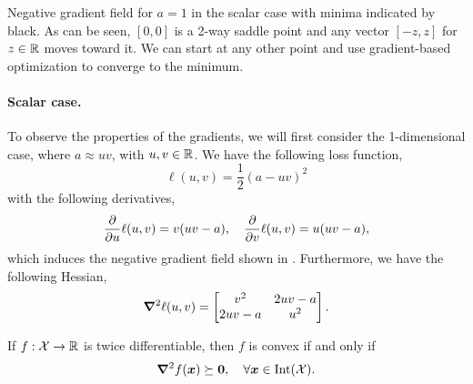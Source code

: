 \begin{marginfigure}
    \centering
    \caption{Negative gradient field for $a=1$ in the scalar case with minima indicated by black. As can be seen, $[0,0]$ is a 2-way saddle point and any vector $[-z,z]$ for $z\in\mathbb{R}$ moves toward it. We can start at any other point and use gradient-based optimization to converge to the minimum.}
    \label{fig:grad-field}
\end{marginfigure}

\paragraph{Scalar case.}

To observe the properties of the gradients, we will first consider the 1-dimensional case, where $a
    \approx uv$, with $u,v\in\mathbb{R}$. We have the following loss function, \[
    \ell(u,v) = \frac{1}{2} (a - uv)^2
\]
with the following derivatives, \[
    \pdv*{\ell(u,v)}{u} = v(uv - a), \quad \pdv*{\ell(u,v)}{v} = u(uv - a),
\]
which induces the negative gradient field shown in . Furthermore, we have the
following Hessian, \[
    \bm{\nabla}^2_{\! } \ell(u,v) = \begin{bmatrix}
        v^2     & 2uv - a \\
        2uv - a & u^2
    \end{bmatrix}.
\]

\begin{lemma}
    If $f: \mathcal{X} \to \mathbb{R}$ is twice differentiable, then $f$ is convex if and only if \[
        \bm{\nabla}^2_{\! } f(\bm{x}) \succeq \bm{0}, \quad \forall \bm{x} \in \mathrm{Int}(\mathcal{X}).
    \]
\end{lemma}

